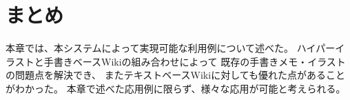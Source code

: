 \section{まとめ}
本章では、本システムによって実現可能な利用例について述べた。
ハイパーイラストと手書きベースWikiの組み合わせによって 既存の手書きメモ・イラストの問題点を解決でき、
またテキストベースWikiに対しても優れた点があることがわかった。
本章で述べた応用例に限らず、様々な応用が可能と考えられる。